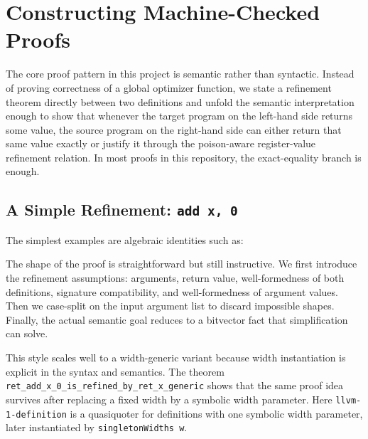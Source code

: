 \section{Constructing Machine-Checked Proofs}
\label{sec:proofs}

The core proof pattern in this project is semantic rather than syntactic.
Instead of proving correctness of a global optimizer function, we state a
refinement theorem directly between two definitions and unfold the semantic
interpretation enough to show that whenever the target program on the
left-hand side returns some value, the source program on the right-hand side
can either return that same value exactly or justify it through the
poison-aware register-value refinement relation. In most proofs in this
repository, the exact-equality branch is enough.

\subsection{A Simple Refinement: \texttt{add x, 0}}

The simplest examples are algebraic identities such as:
\small
{}
\normalsize

The shape of the proof is straightforward but still instructive. We first
introduce the refinement assumptions: arguments, return value,
well-formedness of both definitions, signature compatibility, and
well-formedness of argument values. Then we case-split on the input argument
list to discard impossible shapes. Finally, the actual semantic goal reduces
to a bitvector fact that simplification can solve.

This style scales well to a width-generic variant because width instantiation
is explicit in the syntax and semantics. The theorem
\texttt{ret\_add\_x\_0\_is\_refined\_by\_ret\_x\_generic} shows that the same proof
idea survives after replacing a fixed width by a symbolic width parameter.
Here \texttt{llvm-1-definition} is a quasiquoter for definitions with one
symbolic width parameter, later instantiated by \texttt{singletonWidths w}.
\small
{}
\normalsize


